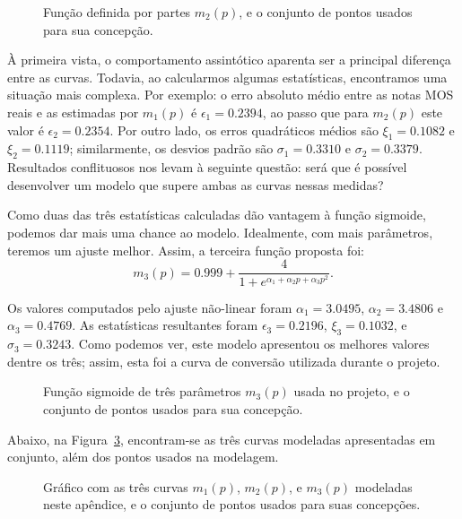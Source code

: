 \begin{figure}[!ht]
    \centering
    
    \caption[Curva definida por partes de conversão de PAQM para MOS]{Função definida por partes $m_2(p)$, e o conjunto de pontos usados para sua concepção.}
    \label{fig:paqmtomos:piecewise}
\end{figure}

À primeira vista, o comportamento assintótico aparenta ser a principal diferença entre as curvas. Todavia, ao calcularmos algumas estatísticas, encontramos uma situação mais complexa. Por exemplo: o erro absoluto médio entre as notas MOS reais e as estimadas por $m_1(p)$ é $\epsilon_1 = 0.2394$, ao passo que para $m_2(p)$ este valor é $\epsilon_2 = 0.2354$. Por outro lado, os erros quadráticos médios são $\xi_1 = 0.1082$ e $\xi_2 = 0.1119$; similarmente, os desvios padrão são $\sigma_1 = 0.3310$ e $\sigma_2 = 0.3379$. Resultados conflituosos nos levam à seguinte questão: será que é possível desenvolver um modelo que supere ambas as curvas nessas medidas?

Como duas das três estatísticas calculadas dão vantagem à função sigmoide, podemos dar mais uma chance ao modelo. Idealmente, com mais parâmetros, teremos um ajuste melhor. Assim, a terceira função proposta foi:
\begin{equation}
    m_3(p) = 0.999 + \frac{4}{1 + e^{\alpha_1 + \alpha_2 p + \alpha_3 p^2}}.
\end{equation}

Os valores computados pelo ajuste não-linear foram $\alpha_1 = 3.0495$, $\alpha_2 = 3.4806$ e $\alpha_3 = 0.4769$. As estatísticas resultantes foram $\epsilon_3 = 0.2196$, $\xi_3 = 0.1032$, e $\sigma_3 = 0.3243$. Como podemos ver, este modelo apresentou os melhores valores dentre os três; assim, esta foi a curva de conversão utilizada durante o projeto.

\begin{figure}[!ht]
    \centering
    
    \caption[Sigmoide de três parâmetros de conversão de PAQM para MOS]{Função sigmoide de três parâmetros $m_3(p)$ usada no projeto, e o conjunto de pontos usados para sua concepção.}
    \label{fig:paqmtomos:sigmoid3}
\end{figure}

Abaixo, na Figura~\ref{fig:paqmtomos:all}, encontram-se as três curvas modeladas apresentadas em conjunto, além dos pontos usados na modelagem.

\begin{figure}[!ht]
    \centering
    
    \caption[Todas as curvas de conversão de PAQM para MOS]{Gráfico com as três curvas $m_1(p)$, $m_2(p)$, e $m_3(p)$ modeladas neste apêndice, e o conjunto de pontos usados para suas concepções.}
    \label{fig:paqmtomos:all}
\end{figure}